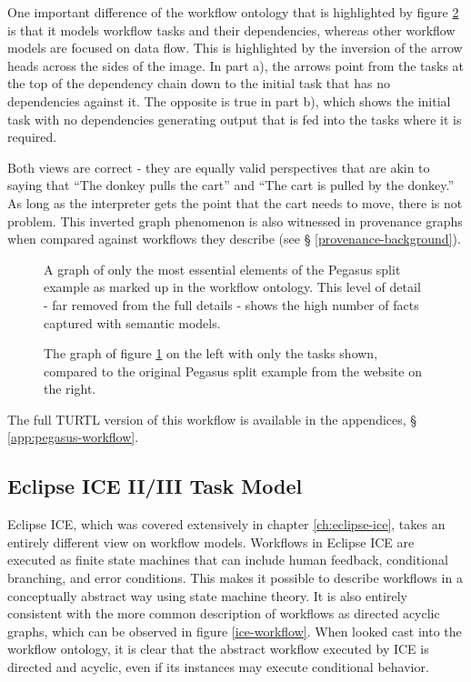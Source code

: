 One important difference of the workflow ontology that is highlighted by
figure \ref{pegasus-comparison} is that it models workflow tasks and their
dependencies, whereas other workflow models are focused on data flow. This is
highlighted by the inversion of the arrow heads across the sides of the image.
In part a), the arrows point from the tasks at the top of the dependency chain
down to the initial task that has no dependencies against it. The opposite is
true in part b), which shows the initial task with no dependencies generating
output that is fed into the tasks where it is required. 

Both views are correct - they are equally valid perspectives that are akin
to saying that ``The donkey pulls the cart'' and ``The cart is pulled by the
donkey.'' As long as the interpreter gets the point that the cart needs to move,
there is not problem. This inverted graph phenomenon is also witnessed in
provenance graphs when compared against workflows they describe (see \S
\ref{provenance-background}).

\begin{figure}[htbp]
\centering
{}
\caption{A graph of only the most essential elements of the Pegasus split
example as marked up in the workflow ontology. This level of detail - far
removed from the full details - shows the high number of facts captured with
semantic models.}
\label{pegasus-split-workflow}
\end{figure}

\begin{figure}[htbp]
\centering
{}
\caption{The graph of figure \ref{pegasus-split-workflow} on the left with only
the tasks shown, compared to the original Pegasus split example from the
website on the right.}
\label{pegasus-comparison}
\end{figure}

The full TURTL version of this workflow is available in the appendices, \S
\ref{app:pegasus-workflow}.

\subsection{Eclipse ICE II/III Task Model}

Eclipse ICE, which was covered extensively in chapter \ref{ch:eclipse-ice},
takes an entirely different view on workflow models. Workflows in Eclipse ICE
are executed as finite state machines that can include human feedback,
conditional branching, and error conditions. This makes it possible to describe
workflows in a conceptually abstract way using state machine theory. It is also
entirely consistent with the more common description of workflows as directed
acyclic graphs, which can be observed in figure \ref{ice-workflow}. When looked
cast into the workflow ontology, it is clear that the abstract workflow executed
by ICE is directed and acyclic, even if its instances may execute conditional
behavior. 

